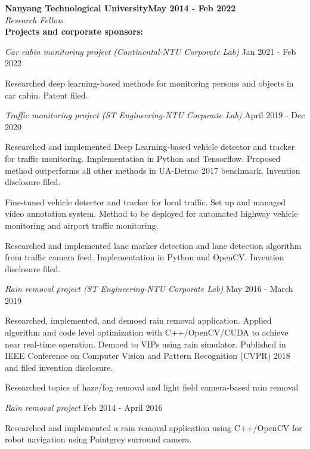 \documentclass[a4paper,11pt]{article}
\newcommand{\customsubsection}[1]{
	\hspace{20pt}\textbf{#1}\\[-2pt]
	\vspace{4pt}
}
\newcommand{\heading}[2]{
	\hspace{10pt}#1\hfill#2\\
}
\newcommand{\headingBf}[2]{
	\heading{\textbf{#1}}{\textbf{#2}}
}
\newcommand{\headingIt}[2]{
	\heading{\textit{#1}}{\textit{#2}}
}
\newenvironment{resume_list}{
	\vspace{-7pt}
	\begin{itemize}[itemsep=-2px, parsep=1pt, leftmargin=30pt]
	}{
	\end{itemize}
}
\newcommand{\itemTitle}[1]{
	\item[] \hspace{-10pt}\textit{#1}\vspace{4pt}
}
\begin{document}
	\headingBf{Nanyang Technological University}{May 2014 - Feb 2022}
	\headingIt{Research Fellow}{}
	\customsubsection{Projects and corporate sponsors:}
	\begin{resume_list}
		\itemTitle{Car cabin monitoring project (Continental-NTU Corporate Lab)}{Jan 2021 - Feb 2022}
		\item Researched deep learning-based methods for monitoring persons and objects in car cabin. Patent filed.
		\vspace{3pt}
		\itemTitle{Traffic monitoring project (ST Engineering-NTU Corporate Lab)}{April 2019 - Dec 2020}
		\item Researched and implemented Deep Learning-based vehicle detector and tracker for traffic monitoring. Implementation in Python and Tensorflow. Proposed method outperforms all other methods in UA-Detrac 2017 benchmark. Invention disclosure filed.
		\item Fine-tuned vehicle detector and tracker for local traffic. Set up and managed video annotation system. Method to be deployed for automated highway vehicle monitoring and airport traffic monitoring.
		\item Researched and implemented lane marker detection and lane detection algorithm from traffic camera feed. Implementation in Python and OpenCV. Invention disclosure filed.
		\vspace{3pt}
		\itemTitle{Rain removal project (ST Engineering-NTU Corporate Lab)}{May 2016 - March 2019}
		\item Researched, implemented, and demoed rain removal application. Applied algorithm and code level optimization with C++/OpenCV/CUDA to achieve near real-time operation. Demoed to VIPs using rain simulator. Published in IEEE Conference on Computer Vision and Pattern Recognition (CVPR) 2018 and filed invention disclosure.
		\item Researched topics of haze/fog removal and light field camera-based rain removal
		\vspace{3pt}
		\itemTitle{Rain removal project}{Feb 2014 - April 2016}
		\item Researched and implemented a rain removal application using C++/OpenCV for robot navigation using Pointgrey surround camera.
		\vspace{3pt}
	\end{resume_list}
\end{document}
